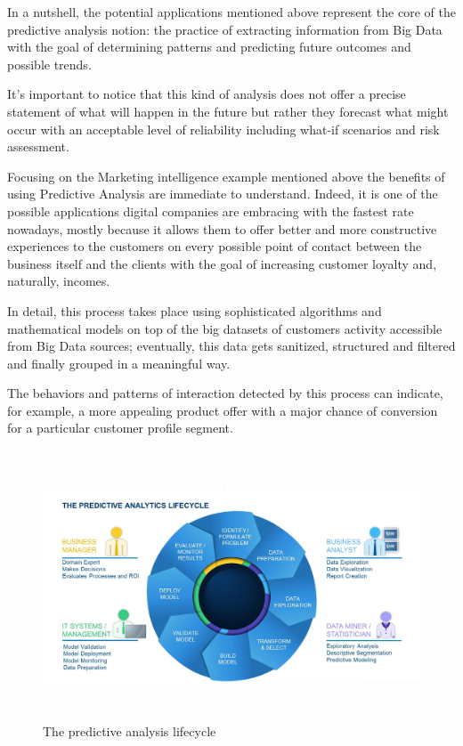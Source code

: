 In a nutshell, the potential applications mentioned above represent the core of the predictive analysis notion: the practice of extracting information from Big Data with the goal of determining patterns and predicting future outcomes and possible trends. 

It's important to notice that this kind of analysis does not offer a precise statement of what will happen in the future but rather they forecast what might occur with an acceptable level of reliability including what-if scenarios and risk assessment.

Focusing on the Marketing intelligence example mentioned above the benefits of using Predictive Analysis are immediate to understand. Indeed, it is one of the possible applications digital companies are embracing with the fastest rate nowadays, mostly because it allows them to offer better and more constructive experiences to the customers on every possible point of contact between the business itself and the clients with the goal of increasing customer loyalty and, naturally, incomes.


In detail, this process takes place using sophisticated algorithms and mathematical models on top of the big datasets of customers activity accessible from Big Data sources; eventually, this data gets sanitized, structured and filtered and finally grouped in a meaningful way. 

The behaviors and patterns of interaction detected by this process can indicate, for example, a more appealing product offer with a major chance of conversion for a particular customer profile segment.

\vspace{0.5cm}
\begin{figure}[htbp]
  \centering
    \includegraphics[height=8cm]{images/pa-lifecycle.jpg}
  \caption{The predictive analysis lifecycle }
  \label{fig:bigdata}
\end{figure}
\vspace{0.5cm}

